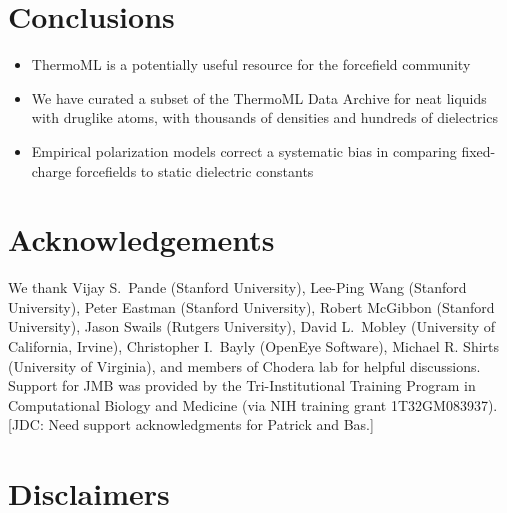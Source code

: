 \documentclass[aps,pre,twocolumn,nofootinbib,superscriptaddress,linenumbers]{revtex4-1}
\begin{document}

\section{Conclusions}

\begin{itemize}
\item  ThermoML is a potentially useful resource for the forcefield community
\item  We have curated a subset of the ThermoML Data Archive for neat liquids with druglike atoms, with thousands of densities and hundreds of dielectrics
\item  Empirical polarization models correct a systematic bias in comparing fixed-charge forcefields to static dielectric constants
\end{itemize}


\section{Acknowledgements}

We thank Vijay S.~Pande (Stanford University), Lee-Ping Wang (Stanford University), Peter Eastman (Stanford University), Robert McGibbon (Stanford University), Jason Swails (Rutgers University), David L.~Mobley (University of California, Irvine), Christopher I.~Bayly (OpenEye Software), Michael R. Shirts (University of Virginia), and members of Chodera lab for helpful discussions.  
Support for JMB was provided by the Tri-Institutional Training Program in Computational Biology and Medicine (via NIH training grant 1T32GM083937).
{\color{red}[JDC: Need support acknowledgments for Patrick and Bas.]}


\section{Disclaimers}
\end{document}
